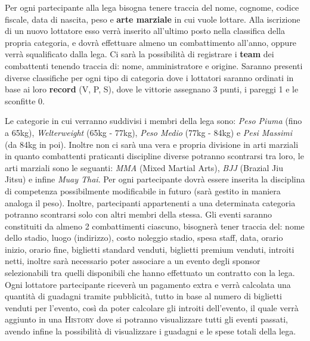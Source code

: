 \documentclass[a4paper,12pt]{report}
\begin{document}
Per ogni partecipante alla lega bisogna tenere traccia del nome, cognome, codice fiscale, data di nascita, peso e \textbf{arte 
marziale} in cui vuole lottare. Alla iscrizione di un nuovo lottatore esso verrà inserito all'ultimo 
posto nella classifica della propria categoria, e dovrà effettuare almeno un combattimento all'anno, oppure verrà  
squalificato dalla lega. Ci sarà la possibilità di registrare i \textbf{team} dei combattenti tenendo traccia di: nome, amministratore e 
origine. Saranno presenti diverse classifiche per ogni tipo di categoria dove i lottatori saranno ordinati 
in base ai loro \textbf{record} (V, P, S), dove le vittorie assegnano 3 punti, i pareggi 1 e le sconfitte 0.\par
Le categorie in cui verranno suddivisi i membri della lega sono: \textit{Peso Piuma} (fino a 65kg), \textit{Welterweight} 
(65kg - 77kg), \textit{Peso Medio} (77kg - 84kg) e \textit{Pesi Massimi} (da 84kg in poi). Inoltre non ci sarà una vera e propria 
divisione in arti marziali in quanto combattenti praticanti discipline diverse potranno scontrarsi tra loro, le arti marziali sono le 
seguanti: \textit{MMA} (Mixed Martial Arts), \textit{BJJ} (Brazial Jiu Jitsu) e infine \textit{Muay Thai}. Per ogni 
partecipante dovrà essere inserita la disciplina di competenza possibilmente modificabile in futuro (sarà gestito in maniera 
analoga il peso). Inoltre, partecipanti appartenenti a una determinata categoria potranno scontrarsi solo con altri membri 
della stessa. Gli eventi saranno constituiti da almeno 2 combattimenti ciascuno, bisognerà tener traccia del: nome dello stadio, 
luogo (indirizzo), costo noleggio stadio, spesa staff, data, orario inizio, orario fine, biglietti standard venduti, biglietti 
premium venduti, introiti netti, inoltre sarà necessario poter associare a un evento degli sponsor selezionabili tra quelli disponibili 
che hanno effettuato un contratto con la lega. Ogni lottatore partecipante riceverà un pagamento extra e verrà calcolata una quantità di guadagni 
tramite pubblicità, tutto in base al numero di biglietti venduti per l'evento, così da poter calcolare gli introiti dell'evento, 
il quale verrà aggiunto in una \textsc{History} dove si potranno visualizzare tutti gli eventi passati, 
avendo infine la possibilità di visualizzare i guadagni e le spese totali della lega.
\end{document}
